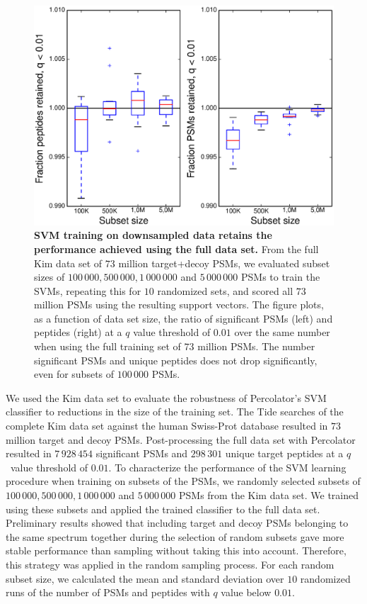 \documentclass{article}
\begin{document}
\begin{figure}
\begin{center}
\includegraphics[width=0.6\linewidth]{./img/subset-performance}
\caption{\label{fig:subset}\textbf{SVM training on downsampled data
    retains the performance achieved using the full data set.}  From
  the full Kim data set of $73$ million target+decoy PSMs, we
  evaluated subset sizes of $100\,000, 500\,000, 1\,000\,000$ and
  $5\,000\,000$ PSMs to train the SVMs, repeating this for $10$
  randomized sets, and scored all $73$ million PSMs using the
  resulting support vectors. The figure plots, as a function of data
  set size, the ratio of significant PSMs (left) and peptides (right)
  at a $q$ value threshold of $0.01$ over the same number when using
  the full training set of $73$ million PSMs. The number significant
  PSMs and unique peptides does not drop significantly, even for
  subsets of $100\,000$ PSMs.}
\end{center}
\end{figure}

We used the Kim data set to evaluate the robustness of Percolator's
SVM classifier to reductions in the size of the training set.  The
Tide searches of the complete Kim data set against the human
Swiss-Prot database resulted in $73$ million target and decoy PSMs.
Post-processing the full data set with Percolator resulted in
$7\,928\,454$ significant PSMs and $298\,301$ unique target peptides
at a $q$~value threshold of $0.01$.  To characterize the performance
of the SVM learning procedure when training on subsets of the PSMs, we
randomly selected subsets of $100\,000, 500\,000, 1\,000\,000$ and
$5\,000\,000$ PSMs from the Kim data set.  We trained using these
subsets and applied the trained classifier to the full data
set. Preliminary results showed that including target and decoy PSMs
belonging to the same spectrum together during the selection of random
subsets gave more stable performance than sampling without taking this
into account. Therefore, this strategy was applied in the random
sampling process. For each random subset size, we calculated the mean
and standard deviation over $10$ randomized runs of the number of PSMs
and peptides with $q$ value below $0.01$.
\end{document}
